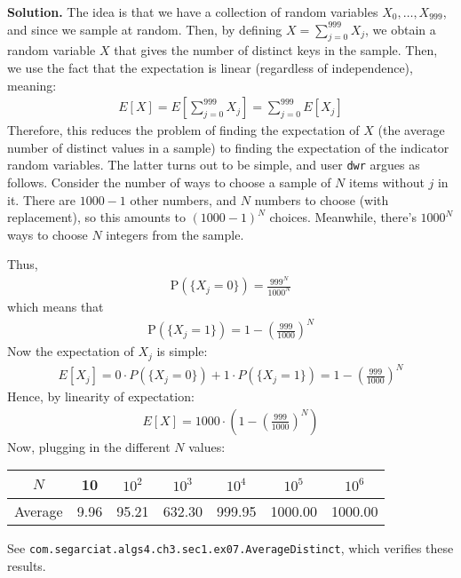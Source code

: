 \documentclass[12pt, a4paper]{article}
\newcommand{\prob}{\text{P}}
\newenvironment{sol}[1][Solution]
{\par\medskip\noindent \textbf{#1.} }
{\medskip}
\begin{document}
\begin{sol}
		The idea is that we have a collection of random variables $X_0,\ldots,X_{999}$,
		and since we sample at random. Then, by defining
		$X=\sum_{j=0}^{999}X_j$, we obtain a random variable $X$ that gives
		the number of distinct keys in the sample. Then, we use the fact that
		the expectation is linear (regardless of independence), meaning:
		\begin{align*}
			E[X] = E\left[\sum_{j=0}^{999}X_j\right]=\sum_{j=0}^{999}E[X_j]
		\end{align*}
		Therefore, this reduces the problem of finding the expectation of $X$
		(the average number of distinct values in a sample) to finding the
		expectation of the indicator random variables. The latter turns out
		to be simple, and user \texttt{dwr} argues as follows. Consider
		the number of ways to choose a sample of $N$ items without $j$ in it.
		There are $1000-1$ other numbers, and $N$ numbers to choose (with replacement),
		so this amounts to $(1000-1)^N$ choices. Meanwhile, there's $1000^N$ ways to
		choose $N$ integers from the sample.
		
		Thus,
		\begin{align*}
			\prob(\{X_j=0\})=\frac{999^N}{1000^N}
		\end{align*}
		which means that
		\begin{align*}
			\prob(\{X_j=1\})=1-\left(\frac{999}{1000}\right)^N
		\end{align*}
		Now the expectation of $X_j$ is simple:
		\begin{align*}
			E[X_j]=0\cdot P(\{X_j=0\}) + 1\cdot P(\{X_j=1\})=1-\left(\frac{999}{1000}\right)^N
		\end{align*}
		Hence, by linearity of expectation:
		\begin{align*}
			E[X]=1000\cdot \left(1-\left(\frac{999}{1000}\right)^N\right)
		\end{align*}
		Now, plugging in the different $N$ values:
		\begin{center}
			\begin{tabular}{c|cccccc}
				$N$ & 10 & $10^2$ & $10^3$ & $10^4$ & $10^5$ & $10^6$ \\
				\hline
				Average & 9.96 & 95.21 & 632.30 & 999.95 & 1000.00 & 1000.00
			\end{tabular}
		\end{center}
		See \texttt{com.segarciat.algs4.ch3.sec1.ex07.AverageDistinct}, which
		verifies these results.
	\end{sol}
	\pagebreak
	\printbibliography
\end{document}
